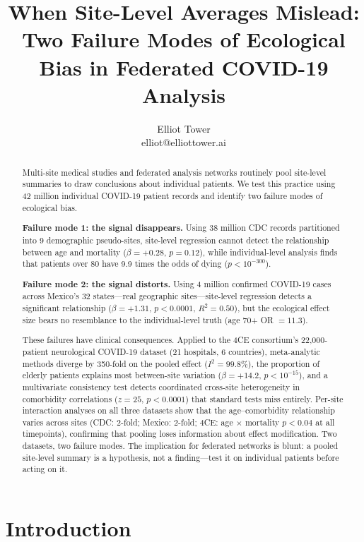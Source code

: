 \documentclass{article}
\title{When Site-Level Averages Mislead:\\Two Failure Modes of Ecological Bias in Federated COVID-19 Analysis}
\author{\name Elliot Tower \\
      \email elliot@elliottower.ai}
\begin{document}
\maketitle

\begin{abstract}
Multi-site medical studies and federated analysis networks routinely pool
site-level summaries to draw conclusions about individual patients.  We test
this practice using 42 million individual COVID-19 patient records and
identify two failure modes of ecological bias.

\textbf{Failure mode 1: the signal disappears.}  Using 38 million CDC
records partitioned into 9 demographic pseudo-sites, site-level regression
cannot detect the relationship between age and mortality ($\beta = +0.28$,
$p = 0.12$), while individual-level analysis finds that patients over 80
have 9.9 times the odds of dying ($p < 10^{-300}$).

\textbf{Failure mode 2: the signal distorts.}  Using 4 million confirmed
COVID-19 cases across Mexico's 32 states---real geographic sites---site-level
regression detects a significant relationship ($\beta = +1.31$,
$p < 0.0001$, $R^2 = 0.50$), but the ecological effect size bears no
resemblance to the individual-level truth (age 70+ OR $= 11.3$).

These failures have clinical consequences.  Applied to the 4CE consortium's
22,000-patient neurological COVID-19 dataset (21 hospitals, 6 countries),
meta-analytic methods diverge by 350-fold on the pooled effect
($I^2 = 99.8\%$), the proportion of elderly patients explains most
between-site variation ($\beta = +14.2$, $p < 10^{-15}$), and a
multivariate consistency test detects coordinated cross-site heterogeneity
in comorbidity correlations ($z = 25$, $p < 0.0001$) that standard tests
miss entirely.  Per-site interaction analyses on all three datasets
show that the age--comorbidity relationship varies across sites (CDC:
2-fold; Mexico: 2-fold; 4CE: age $\times$ mortality $p < 0.04$ at all
timepoints), confirming that pooling loses information about effect
modification.  Two datasets, two failure modes.  The implication for federated
networks is blunt: a pooled site-level summary is a hypothesis, not a
finding---test it on individual patients before acting on it.
\end{abstract}


\section{Introduction}
\end{document}
